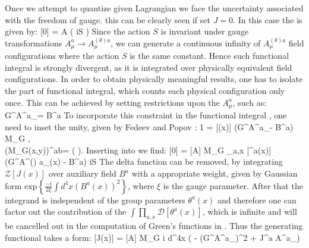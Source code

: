 Once we attempt to quantize given Lagrangian \Eq{\ref{qcd_low:Gen_functional_vec}} we face the uncertainty associated with the freedom of gauge. this can be clearly seen if set $J=0$. In this case the \Eq{\ref{qcd_low:Gen_functional_vec}} is given by:
	\beqa
		\label{qcd_low:Gen_functional_vec_0}
		[0] = \int {} A\; ( iS )
	\eeqa	
Since the action $S$ is invariant under gauge transformations $A^a_\mu \rightarrow A^{(\theta)a}_\mu$, we can generate a continuous infinity of $A^{(\theta)a}_\mu$ field configurations where the action $S$ is the same constant. Hence such functional integral is strongly divergent, as it is integrated over physically equivalent field configurations. In order to obtain physically meaningful results, one has to isolate the part of functional integral, which counts each physical configuration only once. This can be achieved by setting restrictions upon the $A^a_\mu$, such as:
	\beqa
		\label{qcd_low:gauge_fix}
		G^\mu A^a_\mu = B^a
	\eeqa
To incorporate this constraint \Eq{\ref{qcd_low:gauge_fix}} in the functional integral \Eq{\ref{qcd_low:Gen_functional_vec_0}}, one need to inset the unity, given by Fedeev and Popov \cite{--}:
	\beqa
		\label{qcd_low:FP_unity}
		1 = \int {}[\theta(x)] \delta(G^\mu A^a_\mu - B^a) \;  M_G \;, \\ 
		\notag {} \;\;\; (M_G(x,y))^{ab}= \left(  \right)\;.
	\eeqa
Inserting \Eq{\ref{qcd_low:FP_unity}} into \Eq{\ref{qcd_low:Gen_functional_vec_0}} we find:
	\beqa
		\label{qcd_low:Gen_functional_vec_1}
		[0] = \int {} [A] \;  M_G \int \prod_{a,x} [\theta^a(x)] \delta(G^\mu A^{(\theta) a}_\mu(x) - B^a)  \;  \left\lbrace iS\right\rbrace 
	\eeqa
The delta function can be removed, by integrating $\mathcal{Z}[J(x)]$ over auxiliary field $B^a$ with a appropriate weight, given by Gaussian form $\text{exp} \left\lbrace  \frac{-i}{2\xi}\int d^4x (B^a(x))^2 \right\rbrace $, where $\xi$ is the gauge parameter. After that the integrand is independent of the group parameters $\theta^a(x)$ and therefore one can factor out the contribution of the $\int \prod_{a,x} \mathcal{D}[\theta^a(x)]$, which is infinite and will be cancelled out in the computation of Green's functions in \Eq{\ref{qcd_low:Green_func}}. Thus the generating functional takes a form:
	\beqa
		\label{qcd_low:Gen_functional_vec_2}
		 = \int {} [A] \;  M_G \;   \left\lbrace i \int d^4x \left(  - (G^\mu A^a_\mu)^2 + J^{a\mu} A^a_\mu \right)  \right\rbrace \;\;
